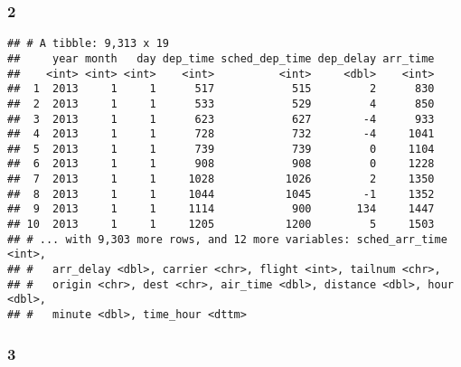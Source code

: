 \documentclass[]{article}
\newenvironment{Shaded}{\begin{snugshade}}{\end{snugshade}}
\newcommand{\KeywordTok}[1]{\textcolor[rgb]{0.13,0.29,0.53}{\textbf{#1}}}
\newcommand{\NormalTok}[1]{#1}
\newcommand{\OperatorTok}[1]{\textcolor[rgb]{0.81,0.36,0.00}{\textbf{#1}}}
\newcommand{\StringTok}[1]{\textcolor[rgb]{0.31,0.60,0.02}{#1}}
\begin{document}
\hypertarget{section-3}{%
\subsubsection{2}\label{section-3}}

\begin{Shaded}
\end{Shaded}

\begin{verbatim}
## # A tibble: 9,313 x 19
##     year month   day dep_time sched_dep_time dep_delay arr_time
##    <int> <int> <int>    <int>          <int>     <dbl>    <int>
##  1  2013     1     1      517            515         2      830
##  2  2013     1     1      533            529         4      850
##  3  2013     1     1      623            627        -4      933
##  4  2013     1     1      728            732        -4     1041
##  5  2013     1     1      739            739         0     1104
##  6  2013     1     1      908            908         0     1228
##  7  2013     1     1     1028           1026         2     1350
##  8  2013     1     1     1044           1045        -1     1352
##  9  2013     1     1     1114            900       134     1447
## 10  2013     1     1     1205           1200         5     1503
## # ... with 9,303 more rows, and 12 more variables: sched_arr_time <int>,
## #   arr_delay <dbl>, carrier <chr>, flight <int>, tailnum <chr>,
## #   origin <chr>, dest <chr>, air_time <dbl>, distance <dbl>, hour <dbl>,
## #   minute <dbl>, time_hour <dttm>
\end{verbatim}

\hypertarget{section-4}{%
\subsubsection{3}\label{section-4}}

\begin{Shaded}
\end{Shaded}
\end{document}
